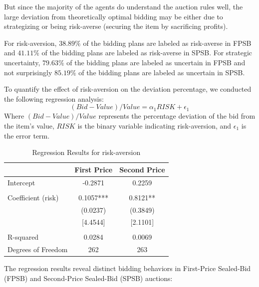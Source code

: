 \documentclass{article} %
\begin{document}
But since the majority of the agents do understand the auction rules well, the large deviation from theoretically optimal bidding may be either due to strategizing or being risk-averse (securing the item by sacrificing profits). 

For risk-aversion, $38.89\%$ of the bidding plans are labeled as risk-averse in FPSB and $41.11\%$ of the bidding plans are labeled as risk-averse in SPSB.
For strategic uncertainty, $79.63\%$ of the bidding plans are labeled as uncertain in FPSB and not surprisingly $85.19\%$ of the bidding plans are labeled as uncertain in SPSB.


To quantify the effect of risk-aversion on the deviation percentage, we conducted the following regression analysis:
\begin{equation}
    (Bid-Value)/Value = \alpha_1 RISK + \epsilon_1
\end{equation}
Where $(Bid-Value)/Value$ represents the percentage deviation of the bid from the item's value, $RISK$ is the binary variable indicating risk-aversion, and $\epsilon_1$ is the error term.

\begin{table}[htbp]
\centering
\begin{tabular}{lcc}
\hline
 & First Price & Second Price \\
\hline
Intercept & -0.2871 & 0.2259 \\
 & & \\
Coefficient (risk) & 0.1057*** & 0.8121** \\
 & (0.0237) & (0.3849) \\
 & [4.4544] & [2.1101] \\
 & & \\
R-squared & 0.0284 & 0.0069 \\
Degrees of Freedom & 262 & 263 \\
\hline
\end{tabular}
\caption{Regression Results for risk-aversion}
\label{tab:regression_results_risk}
\end{table}

The regression results reveal distinct bidding behaviors in First-Price Sealed-Bid (FPSB) and Second-Price Sealed-Bid (SPSB) auctions:
\end{document}
